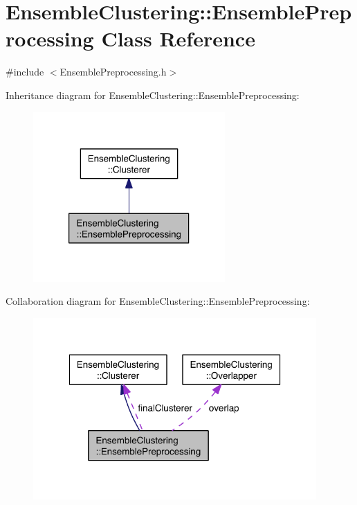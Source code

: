 \hypertarget{class_ensemble_clustering_1_1_ensemble_preprocessing}{\section{Ensemble\-Clustering\-:\-:Ensemble\-Preprocessing Class Reference}
\label{class_ensemble_clustering_1_1_ensemble_preprocessing}
}


{\ttfamily \#include $<$Ensemble\-Preprocessing.\-h$>$}



Inheritance diagram for Ensemble\-Clustering\-:\-:Ensemble\-Preprocessing\-:
\nopagebreak
\begin{figure}[H]
\begin{center}
\leavevmode
\includegraphics[width=208pt]{class_ensemble_clustering_1_1_ensemble_preprocessing__inherit__graph}
\end{center}
\end{figure}


Collaboration diagram for Ensemble\-Clustering\-:\-:Ensemble\-Preprocessing\-:
\nopagebreak
\begin{figure}[H]
\begin{center}
\leavevmode
\includegraphics[width=307pt]{class_ensemble_clustering_1_1_ensemble_preprocessing__coll__graph}
\end{center}
\end{figure}
